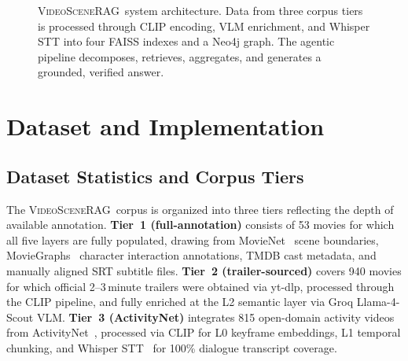 \documentclass[11pt]{article}
\newcommand{\system}{\textsc{VideoSceneRAG}}
\begin{document}
\begin{figure}[!htb]
\caption{\system\ system architecture.  Data from three corpus tiers is
processed through CLIP encoding, VLM enrichment, and Whisper STT into four
FAISS indexes and a Neo4j graph.  The agentic pipeline decomposes, retrieves,
aggregates, and generates a grounded, verified answer.}
\label{fig:overview}
\end{figure}

\section{Dataset and Implementation}
\label{sec:data}

\subsection{Dataset Statistics and Corpus Tiers}

The \system\ corpus is organized into three tiers reflecting the depth of
available annotation.  \textbf{Tier~1 (full-annotation)} consists of 53
movies for which all five layers are fully populated, drawing from
MovieNet~\cite{movienet} scene boundaries, MovieGraphs~\cite{moviegraphs}
character interaction annotations, TMDB cast metadata, and manually aligned
SRT subtitle files.  \textbf{Tier~2 (trailer-sourced)} covers 940 movies for
which official 2--3\,minute trailers were obtained via yt-dlp, processed
through the CLIP pipeline, and fully enriched at the L2 semantic layer via
Groq Llama-4-Scout VLM\@.  \textbf{Tier~3 (ActivityNet)} integrates 815
open-domain activity videos from ActivityNet~\cite{activitynet}, processed
via CLIP for L0 keyframe embeddings, L1 temporal chunking, and Whisper
STT~\cite{whisper} for 100\% dialogue transcript coverage.
\end{document}
